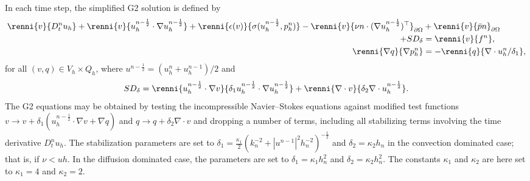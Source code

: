 In each time step, the simplified G2 solution is defined by
\begin{equation}
  \begin{split}
    \renni{v}{D_t^n u_h}
    + \renni{v}{u_h^{n-\frac{1}{2}} \cdot \nabla u_h^{n-\frac{1}{2}}}
    + \renni{\epsilon(v)}{\sigma(u_h^{n-\frac{1}{2}}, p_h^n)}
    - \renni{v}{\nu n \cdot (\nabla u_h^{n-\frac{1}{2}})^{\top}}_{\partial\Omega}
    &+ \renni{v}{\bar{p} n}_{\partial\Omega} \\
    + SD_{\delta}
    &= \renni{v}{f^n}, \\
    \renni{\nabla q}{\nabla p_h^n} &= - \renni{q}{\nabla \cdot u_h^n/\delta_1},
  \end{split}
\end{equation}
for all $(v, q) \in V_h \times Q_h$, where $u^{n-\frac{1}{2}} =
({u}^{n}_h + {u}^{n-1}_h) / 2$ and
\begin{equation}
  SD_{\delta}
  = \renni{u_h^{n-\frac{1}{2}} \cdot \nabla v}{\delta_1 u_h^{n-\frac{1}{2}} \cdot \nabla u_h^{n-\frac{1}{2}}}
  + \renni{\nabla \cdot v}{\delta_2 \nabla \cdot u_h^{n-\frac{1}{2}}}.
\end{equation}
The G2 equations may be obtained by testing the incompressible
Navier--Stokes equations against modified test functions $v
\rightarrow v + \delta_1 (u_h^{n-\frac{1}{2}} \cdot \nabla v + \nabla q)$ and
$q \rightarrow q + \delta_2 \nabla \cdot v$ and dropping a number of
terms, including all stabilizing terms involving the time derivative
$D_t^n u_h$. The stabilization parameters are set to $\delta_{1} =
\frac{\kappa_1}{2}(k_{n}^{-2} +
|u^{n-1}|^{2}h_{n}^{-2})^{-\frac{1}{2}}$ and $\delta_{2}= \kappa_2
h_n$ in the convection dominated case; that is, if $\nu < uh$. In the
diffusion dominated case, the parameters are set to $\delta_{1} =
\kappa_1 h_{n}^2$ and $\delta_{2} = \kappa_2 h_{n}^2$. The constants
$\kappa_1$ and $\kappa_2$ are here set to $\kappa_1 = 4$ and $\kappa_2
= 2$.

\renewcommand{\scheme}[3]{%
\begin{figure}[!b]
  \center
    \small
    \begin{tabular}{l}
      \toprule
      \textbf{Scheme #1:} #2 \\
      \midrule
  \begin{minipage}{.93\textwidth}
        \vspace{0.1cm}
        \begin{enumerate}
          #3
        \end{enumerate}
        \vspace{0.1cm}
      \end{minipage} \\
      \bottomrule
    \end{tabular}
    \normalsize
 \vspace*{-8pt} %
\end{figure}}


